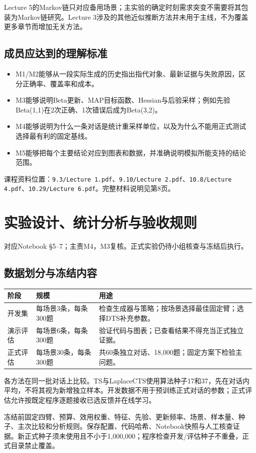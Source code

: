 \documentclass[11pt,a4paper]{article}
\newcommand{\code}[1]{\texttt{\small #1}}
\newcommand{\note}[1]{{\small\color{muted}#1\par}}
\newcommand{\pagetitle}[2]{\section{#1}\note{#2}}
\begin{document}
Lecture 5的Markov链只对应备用场景；主实验的确定时刻需求突变不需要将其包装为Markov链研究。Lecture 3涉及的其他近似推断方法并未用于主线，不为覆盖更多章节而增加无关方法。

\subsection{成员应达到的理解标准}
\begin{itemize}
\item M1/M2能够从一段实际生成的历史指出指代对象、最新证据与失败原因，区分正确率、覆盖率和成本。
\item M3能够说明Beta更新、MAP目标函数、Hessian与后验采样；例如先验Beta(1,1)在2次正确、1次错误后成为Beta(3,2)。
\item M4能够说明为什么一条对话是统计重采样单位，以及为什么不能用正式测试选择最有利的固定基线。
\item M5能够把每个主要结论对应到图表和数据，并准确说明模拟所能支持的结论范围。
\end{itemize}
\note{课程资料位置：\code{9.3/Lecture 1.pdf}、\code{9.10/Lecture 2.pdf}、\code{10.8/Lecture 4.pdf}、\code{10.29/Lecture 6.pdf}。完整材料说明见第8页。}

\newpage
\pagetitle{实验设计、统计分析与验收规则}{对应Notebook §5--7；主责M4，M3复核。正式实验仍待小组核查与冻结后执行。}
\subsection{数据划分与冻结内容}
\begin{center}\small
\begin{tabularx}{\linewidth}{@{}p{28mm}p{41mm}Y@{}}\toprule
阶段 & 规模 & 用途 \\\midrule
开发集 & 每场景3条，每条300题 & 检查生成器与策略；按场景选择最佳固定臂；选择DTS补充参数。\\
演示评估 & 每场景6条，每条300题 & 验证代码与图表；已查看结果不得充当正式独立证据。\\
正式评估 & 每场景30条，每条300题 & 共60条独立对话、18,000题；固定方案下检验主问题。\\\bottomrule
\end{tabularx}\end{center}
各方法在同一批对话上比较。TS与LaplaceCTS使用算法种子17和37，先在对话内平均，不将其视为新增独立样本。开发数据不用于预训练正式对话的参数；正式评估允许按既定程序逐题接收已选反馈并在线学习。

冻结前固定四臂、预算、效用权重、特征、先验、更新频率、场景、样本量、种子、主次比较和分析规则。保存配置、代码哈希、Notebook快照与人工核查证据。新正式种子须未使用且不小于1,000,000；程序检查开发/评估种子不重叠，正式目录禁止覆盖。
\end{document}
